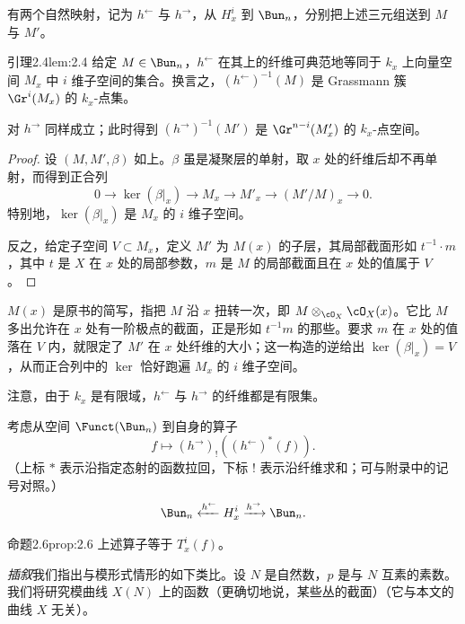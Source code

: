 有两个自然映射，记为 $h^{\leftarrow}$ 与 $h^{\rightarrow}$，从 $H_x^i$ 到 $\Bun_n$，分别把上述三元组送到 $M$ 与 $M'$。

\begin{othm}{引理}{2.4}{lem:2.4}
给定 $M\in\Bun_n$，$h^{\leftarrow}$ 在其上的纤维可典范地等同于 $k_x$ 上向量空间 $M_x$ 中 $i$ 维子空间的集合。换言之，$(h^{\leftarrow})^{-1}(M)$ 是 Grassmann 簇 $\Gr^i(M_x)$ 的 $k_x$-点集。
\end{othm}

对 $h^{\rightarrow}$ 同样成立；此时得到 $(h^{\rightarrow})^{-1}(M')$ 是 $\Gr^{n-i}(M'_x)$ 的 $k_x$-点空间。

\begin{proof}
设 $(M,M',\beta)$ 如上。$\beta$ 虽是凝聚层的单射，取 $x$ 处的纤维后却不再单射，而得到正合列
\[
0\to\ker(\beta|_x)\to M_x\to M'_x\to(M'/M)_x\to0.
\]
特别地，$\ker(\beta|_x)$ 是 $M_x$ 的 $i$ 维子空间。

反之，给定子空间 $V\subset M_x$，定义 $M'$ 为 $M(x)$ 的子层，其局部截面形如 $t^{-1}\cdot m$，其中 $t$ 是 $X$ 在 $x$ 处的局部参数，$m$ 是 $M$ 的局部截面且在 $x$ 处的值属于 $V$。
\end{proof}

\begin{annote}
$M(x)$ 是原书的简写，指把 $M$ 沿 $x$ 扭转一次，即 $M\otimes_{\cO_X}\cO_X(x)$。它比 $M$ 多出允许在 $x$ 处有一阶极点的截面，正是形如 $t^{-1}m$ 的那些。要求 $m$ 在 $x$ 处的值落在 $V$ 内，就限定了 $M'$ 在 $x$ 处纤维的大小；这一构造的逆给出 $\ker(\beta|_x)=V$，从而正合列中的 $\ker$ 恰好跑遍 $M_x$ 的 $i$ 维子空间。\par\vspace{0.15em}{\raggedleft 【来源：原书 \S2.4（A）；$M(x)$ 的常规含义（B）】\par}
\end{annote}

注意，由于 $k_x$ 是有限域，$h^{\leftarrow}$ 与 $h^{\rightarrow}$ 的纤维都是有限集。

考虑从空间 $\Funct(\Bun_n)$ 到自身的算子
\[
f\mapsto(h^{\rightarrow})_!((h^{\leftarrow})^*(f)).
\]
（上标 $*$ 表示沿指定态射的函数拉回，下标 $!$ 表示沿纤维求和；可与附录中的记号对照。）
\[
\Bun_n\xleftarrow{h^{\leftarrow}}H_x^i\xrightarrow{h^{\rightarrow}}\Bun_n.
\]

\begin{othm}{命题}{2.6}{prop:2.6}
上述算子等于 $T_x^i(f)$。
\end{othm}

\emph{插叙}\quad 我们指出与模形式情形的如下类比。设 $N$ 是自然数，$p$ 是与 $N$ 互素的素数。我们将研究模曲线 $X(N)$ 上的函数（更确切地说，某些丛的截面）（它与本文的曲线 $X$ 无关）。

